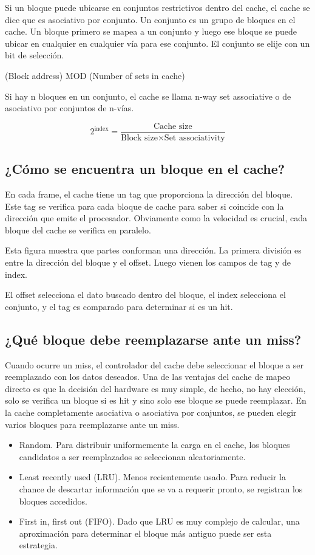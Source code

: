 Si un bloque puede ubicarse en conjuntos restrictivos dentro del cache, el cache se dice que es asociativo por conjunto. Un conjunto es un grupo de bloques en el cache. Un bloque primero se mapea a un conjunto y luego ese bloque se puede ubicar en cualquier en cualquier vía para ese conjunto. El conjunto se elije con un bit de selección.

(Block address) MOD (Number of sets in cache)

Si hay n bloques en un conjunto, el cache se llama n-way set associative o de asociativo por conjuntos de n-vías.


\[ 2^{\text{index}} = \frac{\text{Cache size}}{\text{Block size} \times \text{Set associativity}} \]


\subsection{¿Cómo se encuentra un bloque en el cache?}

En cada frame, el cache tiene un tag que proporciona la dirección del bloque. Este tag se verifica para cada bloque de cache para saber si coincide con la dirección que emite el procesador. Obviamente como la velocidad es crucial, cada bloque del cache se verifica en paralelo.


Esta figura muestra que partes conforman una dirección. La primera división es entre la dirección del bloque y el offset. Luego vienen los campos de tag y de index. 

El offset selecciona el dato buscado dentro del bloque, el index selecciona el conjunto, y el tag es comparado para determinar si es un hit.


\subsection{¿Qué bloque debe reemplazarse ante un miss?}
Cuando ocurre un miss, el controlador del cache debe seleccionar el bloque a ser reemplazado con los datos deseados. Una de las ventajas del cache de mapeo directo es que la decisión del hardware es muy simple, de hecho, no hay elección, solo se verifica un bloque si es hit y sino solo ese bloque se puede reemplazar. En la cache completamente asociativa o asociativa por conjuntos, se pueden elegir varios bloques para reemplazarse ante un miss.

\begin{itemize}
\item Random. Para distribuir uniformemente la carga en el cache, los bloques candidatos a ser reemplazados se seleccionan aleatoriamente.
\item Least recently used (LRU). Menos recientemente usado. Para reducir la chance de descartar información que se va a requerir pronto, se registran los bloques accedidos.
\item First in, first out (FIFO). Dado que LRU es muy complejo de calcular, una aproximación para determinar el bloque más antiguo puede ser esta estrategia. 
\end{itemize}

